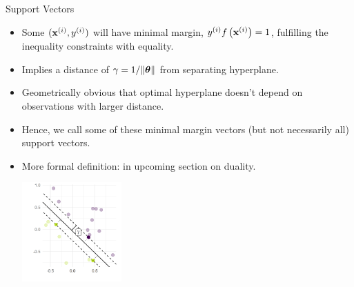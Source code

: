 \documentclass[11pt,compress,t,notes=noshow, xcolor=table]{beamer}
\begin{document}
\begin{vbframe}{Support Vectors}



  \begin{itemize}
    \item Some $(\mathbf{x}^{(i)}, y^{(i)})$ will have minimal margin, 
    $y^{(i)}  f\left(\mathbf{x}^{(i)}\right) = 1$, fulfilling the inequality constraints with equality.
    \item Implies a distance of $\gamma = 1 / \|\bm{\theta}\|$ from separating hyperplane.
    \item Geometrically obvious 
      that optimal hyperplane doesn't depend on observations with larger distance.
    \item Hence, we call some of these minimal margin vectors (but not necessarily all) {support vectors}.
    \item More formal definition: in upcoming section on duality. 
    
    
\begin{center}
\includegraphics[width=0.3\textwidth]{figure/support_vectors.png} \\
\end{center}


  \end{itemize}


\end{vbframe}
\end{document}
